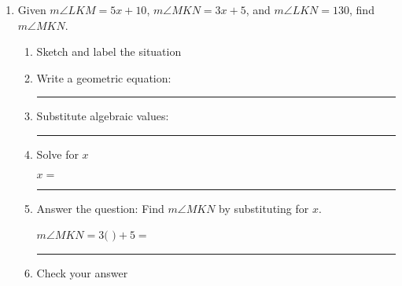 \documentclass[12pt, oneside]{article}
\begin{document}
\begin{enumerate}
  \newpage
        \item Given $m\angle LKM = 5x+10$, $m\angle MKN = 3x+5$, and $m\angle LKN = 130$, find $m\angle MKN$.  \vspace{.2cm}
        \begin{enumerate}
          \item Sketch and label the situation
          \begin{flushright}
          \end{flushright}
          \vspace{1cm}

          \item Write a geometric equation: \rule{5cm}{0.15mm} \vspace{1cm}
          \item Substitute algebraic values: \rule{5cm}{0.15mm}
          \item Solve for $x$
          \vspace{4cm}
          \begin{center} $x=$ \rule{1cm}{0.15mm} \end{center}
          \item Answer the question: Find $m\angle MKN$ by substituting for $x$.\\
          \begin{center} $m\angle MKN=3($ \hspace{1cm} $)+5=$ \rule{1cm}{0.15mm} \end{center}
          \item Check your answer
        \end{enumerate}
        \vspace{2cm}


    \end{enumerate}
\end{document}
